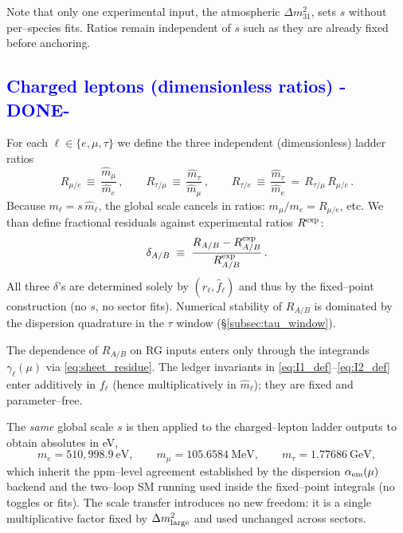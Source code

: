 \documentclass[%
 amsmath,amssymb,
 aps,
prb,
floatfix, showkeys
]{revtex4-2}
\newcommand{\modif}[1]{\textcolor{blue}{#1}}
\begin{document}
Note that only one experimental input, the atmospheric $\Delta m^2_{31}$,  sets $s$ without
per--species fits. Ratios remain independent of $s$ such as
they are already fixed before anchoring.














{\modif{
\subsection{Charged leptons (dimensionless ratios)  -DONE-}
\label{subsec:leptons_ratios}
}}
For each $\ell\in\{e,\mu,\tau\}$ we  define 
 the three independent (dimensionless) ladder ratios
\begin{equation}
  R_{\mu/e} \,\equiv\, \frac{\widehat m_\mu}{\widehat m_e}\,,\qquad
  R_{\tau/\mu} \,\equiv\, \frac{\widehat m_\tau}{\widehat m_\mu}\,,\qquad
  R_{\tau/e} \,\equiv\, \frac{\widehat m_\tau}{\widehat m_e}
  \,=\, R_{\tau/\mu}\,R_{\mu/e}\,.
  \label{eq:lepton_ratios}
\end{equation}
Because $m_\ell = s\,\widehat m_\ell$, the global scale cancels in ratios: $m_\mu/m_e = R_{\mu/e}$, etc.
We than define fractional residuals against experimental ratios $R^{\rm exp}$:
\begin{equation}
  \delta_{A/B} \;\equiv\; \frac{R_{A/B} - R^{\rm exp}_{A/B}}{R^{\rm exp}_{A/B}}\,.
  \label{eq:ratio_residuals}
\end{equation}
All three $\delta$'s are determined solely by $(r_\ell,\widehat f_\ell)$ and thus by the fixed--point construction (no $s$, no sector fits). Numerical stability of $R_{A/B}$ is dominated by the dispersion quadrature in the $\tau$ window (\S\ref{subsec:tau_window}).


The dependence of $R_{A/B}$ on RG inputs enters only through the integrands
$\gamma_\ell(\mu)$ via \eqref{eq:sheet_residue}.
The ledger invariants in \eqref{eq:I1_def}–\eqref{eq:I2_def} enter additively in $f_\ell$
(hence multiplicatively in $\widehat m_\ell$); they are fixed and parameter--free.

The \emph{same} global scale $s$ is then applied to the charged--lepton
ladder outputs to obtain absolutes in eV,
\[
m_e=510{,}998.9~\text{eV},\qquad
m_\mu=105.6584~\text{MeV},\qquad
m_\tau=1.77686~\text{GeV},
\]
which inherit the ppm--level agreement established by the dispersion $\alpha_{\rm em}(\mu)$ backend and the two--loop SM running used inside the fixed--point integrals (no toggles or fits). The scale transfer introduces no new freedom: it is a single multiplicative factor fixed by $\Delta m^2_{\rm large}$ and used unchanged across sectors.
\end{document}
